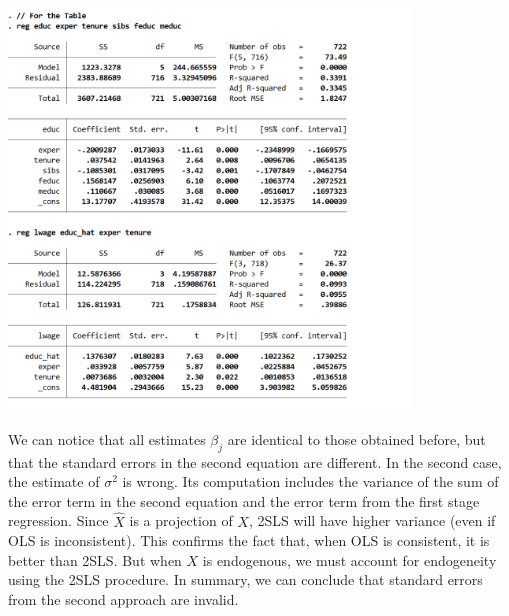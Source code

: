 \documentclass[12pt, oneside]{article}
\begin{document}
\begin{center}
    \includegraphics[width=0.8\textwidth]{Figure/P3.4.jpg}
\end{center}

We can notice that all estimates $\beta_j$ are identical to those obtained before, but that the standard errors in the second equation are different. In the second case, the estimate of $\sigma^2$ is wrong. Its computation includes the variance of the sum of the error term in the second equation and the error term from the first stage regression. Since $\hat{X}$ is a projection of $X$, 2SLS will have higher variance (even if OLS is inconsistent). This confirms the fact that, when OLS is consistent, it is better than 2SLS. But when $X$ is endogenous, we must account for endogeneity using the 2SLS procedure. In summary, we can conclude that standard errors from the second approach are invalid.
\end{document}
